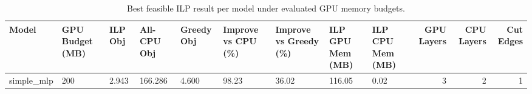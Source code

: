 \begin{table}[t]
\centering
\caption{Best feasible ILP result per model under evaluated GPU memory budgets.}
\label{tab:ilp-best-per-model}
\begin{tabular}{lllllllllrrr}
\toprule
Model & GPU Budget (MB) & ILP Obj & All-CPU Obj & Greedy Obj & Improve vs CPU (\%) & Improve vs Greedy (\%) & ILP GPU Mem (MB) & ILP CPU Mem (MB) & GPU Layers & CPU Layers & Cut Edges \\
\midrule
simple_mlp & 200 & 2.943 & 166.286 & 4.600 & 98.23 & 36.02 & 116.05 & 0.02 & 3 & 2 & 1 \\
\bottomrule
\end{tabular}

\end{table}
